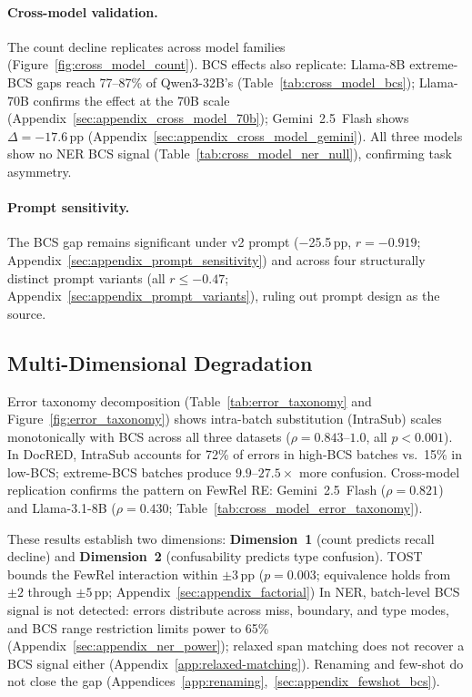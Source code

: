 \paragraph{Cross-model validation.}
The count decline replicates across model families (Figure~\ref{fig:cross_model_count}). BCS effects also replicate: Llama-8B extreme-BCS gaps reach 77--87\% of Qwen3-32B's (Table~\ref{tab:cross_model_bcs}); Llama-70B confirms the effect at the 70B scale (Appendix~\ref{sec:appendix_cross_model_70b}); Gemini~2.5~Flash shows $\Delta = -17.6$\,pp (Appendix~\ref{sec:appendix_cross_model_gemini}). All three models show no NER BCS signal (Table~\ref{tab:cross_model_ner_null}), confirming task asymmetry.

\paragraph{Prompt sensitivity.}
The BCS gap remains significant under v2 prompt ($-$25.5\,pp, $r = -0.919$; Appendix~\ref{sec:appendix_prompt_sensitivity}) and across four structurally distinct prompt variants (all $r \leq -0.47$; Appendix~\ref{sec:appendix_prompt_variants}), ruling out prompt design as the source.

\subsection{Multi-Dimensional Degradation}
\label{sec:multi_channel}

Error taxonomy decomposition (Table~\ref{tab:error_taxonomy} and Figure~\ref{fig:error_taxonomy}) shows intra-batch substitution (IntraSub) scales monotonically with BCS across all three datasets ($\rho = 0.843\text{--}1.0$, all $p < 0.001$). In DocRED, IntraSub accounts for 72\% of errors in high-BCS batches vs.\ 15\% in low-BCS; extreme-BCS batches produce $9.9\text{--}27.5\times$ more confusion. Cross-model replication confirms the pattern on FewRel RE: Gemini~2.5~Flash ($\rho = 0.821$) and Llama-3.1-8B ($\rho = 0.430$; Table~\ref{tab:cross_model_error_taxonomy}).

These results establish two dimensions: \textbf{Dimension~1} (count predicts recall decline) and \textbf{Dimension~2} (confusability predicts type confusion). TOST \citep{lakens-2017-equivalence,schuirmann-1987-tost} bounds the FewRel interaction within $\pm 3$\,pp ($p = 0.003$; equivalence holds from $\pm 2$ through $\pm 5$\,pp; Appendix~\ref{sec:appendix_factorial}) In NER, batch-level BCS signal is not detected: errors distribute across miss, boundary, and type modes, and BCS range restriction limits power to 65\% (Appendix~\ref{sec:appendix_ner_power}); relaxed span matching does not recover a BCS signal either (Appendix~\ref{app:relaxed-matching}). Renaming and few-shot do not close the gap (Appendices~\ref{app:renaming},~\ref{sec:appendix_fewshot_bcs}).

